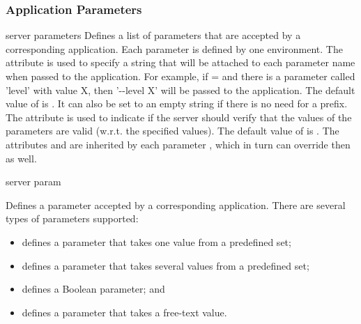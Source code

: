 \subsubsection{Application Parameters}

\bigskip 
\xmlstruct
{server}
{parameters} 
{%
%
  Defines a list of parameters that are accepted by a corresponding
  application. Each parameter is defined by one
   environment.
  The  attribute is used to specify a string
  that will be attached to each parameter name when passed to the
  application.
  For example, if = and
  there is a parameter called 'level' with value X, then '{-}{-}level
  X' will be passed to the application.  The default value of
   is . It can also be set
  to an empty string if there is no need for a prefix.
  The  attribute is used to indicate if the
  server should verify that the values of the parameters are valid
  (w.r.t. the specified values). The default value of
   is .
  The attributes  and  are
  inherited by each parameter , which in turn can
  override then as well.
%
}
{}%

\bigskip
\xmlstruct
{server}
{param}
{%
%
  Defines a parameter accepted by a corresponding application. There
  are several types of parameters supported:
\begin{itemize}
\item {} defines a parameter that takes one
  value from a predefined set;
\item {} defines a parameter that takes several
  values from a predefined set;
\item {} defines a Boolean parameter; and
\item {} defines a parameter that takes a
  free-text value.
\end{itemize}
%
}


